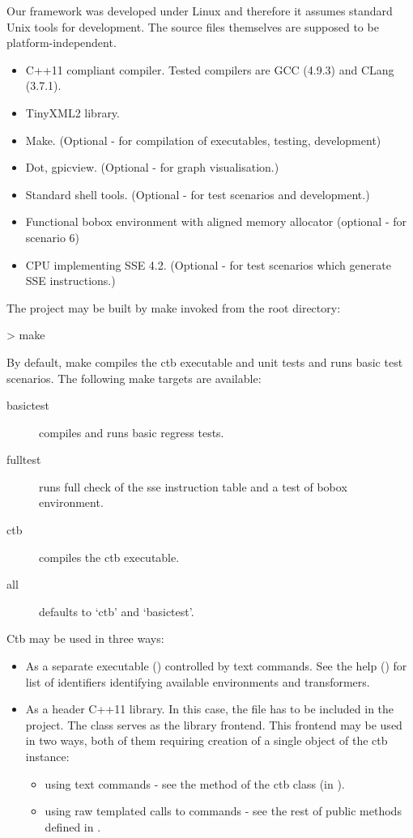 Our framework was developed under Linux and therefore it assumes standard Unix tools for development. The source files themselves are supposed to be platform-independent. 

\begin{itemize}
  \item C++11 compliant compiler. Tested compilers are GCC (4.9.3) and CLang (3.7.1).
  \item TinyXML2 library.
  \item Make. (Optional - for compilation of executables, testing, development)
  \item Dot, gpicview. (Optional - for graph visualisation.)
  \item Standard shell tools. (Optional - for test scenarios and development.) 
  \item Functional bobox environment with aligned memory allocator (optional - for scenario 6)
  \item CPU implementing SSE 4.2. (Optional - for test scenarios which generate SSE instructions.)
\end{itemize}

The project may be built by make invoked from the root directory:
\begin{code}
> make
\end{code}

By default, make compiles the ctb executable and unit tests and runs basic test scenarios. The following make targets are available:

\begin{description}
  \item[basictest] compiles and runs basic regress tests.
  \item[fulltest] runs full check of the sse instruction table and a test of bobox environment.
  \item[ctb] compiles the ctb executable.
  \item[all] defaults to `ctb' and `basictest'.
\end{description}


Ctb may be used in three ways:
\begin{itemize}
  \item As a separate executable () controlled by text commands. See the help () for list of identifiers identifying available environments and transformers.
  \item As a header C++11 library. In this case, the  file has to be included in the project. The  class serves as the library frontend. This frontend may be used in two ways, both of them requiring creation of a single object of the ctb instance:
  \begin{itemize}
    \item using text commands - see the  method of the ctb class (in ).
    \item using raw templated calls to commands - see the rest of public methods defined in .
  \end{itemize}
\end{itemize}

